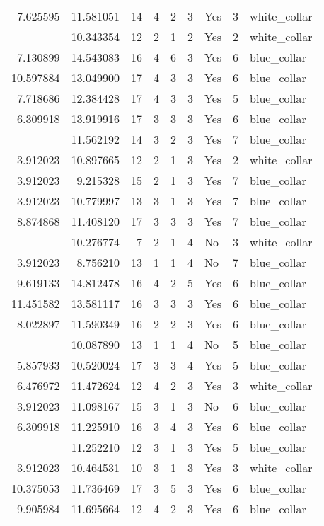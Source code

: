 \documentclass[
]{article}
\begin{document}
\begin{longtable}[t]{rrrrrllrl}
7.625595 & 11.581051 & 14 & 4 & 2 & 3 & Yes & 3 & white\_collar\\
\addlinespace
3.912023 & 10.343354 & 12 & 2 & 1 & 2 & Yes & 2 & white\_collar\\
7.130899 & 14.543083 & 16 & 4 & 6 & 3 & Yes & 6 & blue\_collar\\
10.597884 & 13.049900 & 17 & 4 & 3 & 3 & Yes & 6 & blue\_collar\\
7.718686 & 12.384428 & 17 & 4 & 3 & 3 & Yes & 5 & blue\_collar\\
6.309918 & 13.919916 & 17 & 3 & 3 & 3 & Yes & 6 & blue\_collar\\
\addlinespace
8.929303 & 11.562192 & 14 & 3 & 2 & 3 & Yes & 7 & blue\_collar\\
3.912023 & 10.897665 & 12 & 2 & 1 & 3 & Yes & 2 & white\_collar\\
3.912023 & 9.215328 & 15 & 2 & 1 & 3 & Yes & 7 & blue\_collar\\
3.912023 & 10.779997 & 13 & 3 & 1 & 3 & Yes & 7 & blue\_collar\\
8.874868 & 11.408120 & 17 & 3 & 3 & 3 & Yes & 7 & blue\_collar\\
\addlinespace
3.912023 & 10.276774 & 7 & 2 & 1 & 4 & No & 3 & white\_collar\\
3.912023 & 8.756210 & 13 & 1 & 1 & 4 & No & 7 & blue\_collar\\
9.619133 & 14.812478 & 16 & 4 & 2 & 5 & Yes & 6 & blue\_collar\\
11.451582 & 13.581117 & 16 & 3 & 3 & 3 & Yes & 6 & blue\_collar\\
8.022897 & 11.590349 & 16 & 2 & 2 & 3 & Yes & 6 & blue\_collar\\
\addlinespace
3.912023 & 10.087890 & 13 & 1 & 1 & 4 & No & 5 & blue\_collar\\
5.857933 & 10.520024 & 17 & 3 & 3 & 4 & Yes & 5 & blue\_collar\\
6.476972 & 11.472624 & 12 & 4 & 2 & 3 & Yes & 3 & white\_collar\\
3.912023 & 11.098167 & 15 & 3 & 1 & 3 & No & 6 & blue\_collar\\
6.309918 & 11.225910 & 16 & 3 & 4 & 3 & Yes & 6 & blue\_collar\\
\addlinespace
3.912023 & 11.252210 & 12 & 3 & 1 & 3 & Yes & 5 & blue\_collar\\
3.912023 & 10.464531 & 10 & 3 & 1 & 3 & Yes & 3 & white\_collar\\
10.375053 & 11.736469 & 17 & 3 & 5 & 3 & Yes & 6 & blue\_collar\\
9.905984 & 11.695664 & 12 & 4 & 2 & 3 & Yes & 6 & blue\_collar\\

\end{longtable}
\end{document}
